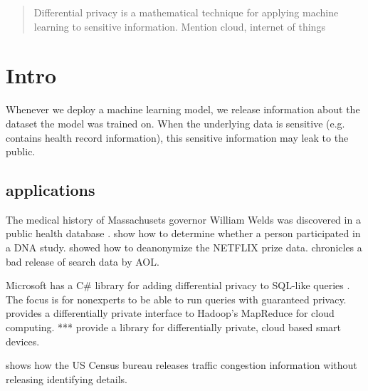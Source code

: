 \documentclass{icopust}
\begin{document}
\maketitle
\begin{abstract}
    Differential privacy is a mathematical technique for applying machine learning to sensitive information. 
    Mention cloud, internet of things
\end{abstract}



\section{Intro}
    Whenever we deploy a machine learning model, 
    we release information about the dataset the model was trained on.
    When the underlying data is sensitive (e.g. contains health record information),
    this sensitive information may leak to the public.

\subsection{applications}
The medical history of Massachusets governor William Welds was discovered in a public health database \cite{sweeney2002k}.
\cite{homer2008resolving} show how to determine whether a person participated in a DNA study.
\cite{narayanan2008robust} showed how to deanonymize the NETFLIX prize data.
\cite{nytimes2006user} chronicles a bad release of search data by AOL.

Microsoft has a C\# library for adding differential privacy to SQL-like queries \cite{mcsherry2010privacy}.
The focus is for nonexperts to be able to run queries with guaranteed privacy.
\cite{roy2010airavat} provides a differentially private interface to Hadoop's MapReduce for cloud computing.
***\cite{hamm2015crowd} provide a library for differentially private, cloud based smart devices.
\cite{qin2016heavy}

\cite{machanavajjhala2008privacy} shows how the US Census bureau releases traffic congestion information without releasing identifying details.
\end{document}
